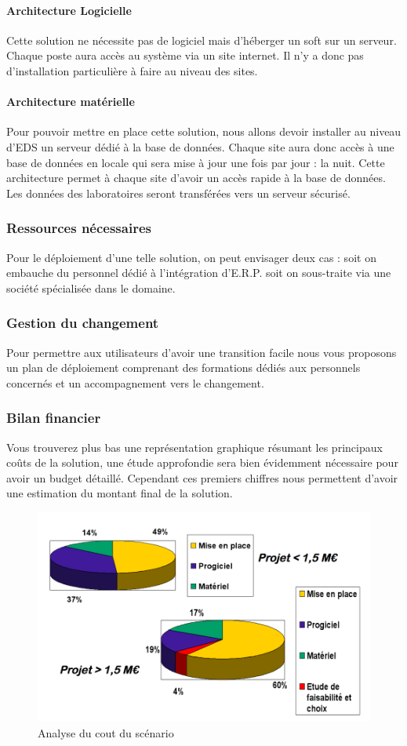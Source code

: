 \paragraph{Architecture Logicielle}
Cette solution ne nécessite pas de logiciel mais d'héberger un soft sur un serveur. Chaque poste aura accès au système via un site internet. Il n'y a donc pas d'installation particulière à faire au niveau des sites.
\paragraph{Architecture matérielle}
Pour pouvoir mettre en place cette solution, nous allons devoir installer au niveau d'EDS un serveur dédié à la base de données. Chaque site aura donc accès à une base de données en locale qui sera mise à jour une fois par jour : la nuit. Cette architecture permet à chaque site d'avoir un accès rapide à la base de données. Les données des laboratoires seront transférées vers un serveur sécurisé. 
\subsubsection{Ressources nécessaires}
Pour le déploiement d'une telle solution, on peut envisager deux cas : soit on embauche du personnel dédié à l'intégration d'E.R.P. soit on sous-traite via une société spécialisée dans le domaine.
\subsubsection{Gestion du changement}
Pour permettre aux utilisateurs d'avoir une transition facile nous vous proposons un plan de déploiement comprenant des formations dédiés aux personnels concernés et un accompagnement vers le changement.
\subsubsection{Bilan financier}
Vous trouverez plus bas une représentation graphique résumant les principaux coûts de la solution, une étude approfondie sera bien évidemment nécessaire pour avoir un budget détaillé. Cependant ces premiers chiffres nous permettent d'avoir une estimation du montant final de la solution.
\begin{figure}[H]
\begin{center}
 \includegraphics[scale=0.4]{CoutSolution.png}
  \caption{Analyse du cout du scénario}
\end{center}  
\end{figure}
